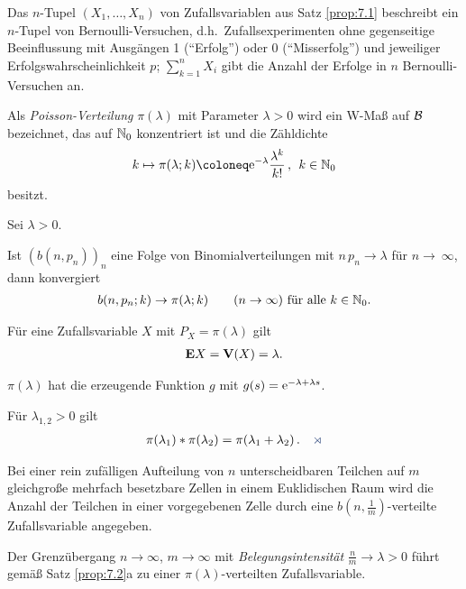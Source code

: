 \begin{bem}
\label{bem:7.1}
Das $n$-Tupel $(X_{1},\ldots, X_{n})$ von Zufallsvariablen aus Satz
\ref{prop:7.1} beschreibt ein $n$-Tupel von Bernoulli-Versuchen, d.h.\
Zufallsexperimenten ohne gegenseitige Beeinflussung mit Ausgängen 1
(``Erfolg'') oder 0 (``Misserfolg'') und jeweiliger Erfolgswahrscheinlichkeit
$p$; $\sum^ {n}_{k=1} X_{i}$ gibt die Anzahl der Erfolge in $n$
Bernoulli-Versuchen an.\maphere
\end{bem}

\begin{defn}
\label{defn:7.2}
Als \emph{Poisson-Verteilung} $\pi (\lambda )$ mit
Parameter $\lambda > 0$ wird ein W-Maß auf ${\mathcal{B}}$ bezeichnet, das auf
$\mathbb{N}_{0}$ konzentriert ist und die Zähldichte
\begin{align*}
k\mapsto \pi (\lambda ; k) \defl \e^ {-\lambda }\frac{\lambda ^ {k}}{k!} \, , \;\,
k\in \N_{0}
\end{align*}
besitzt.\fishhere
\end{defn}

\begin{prop}
\label{prop:7.2}
Sei $\lambda >0$.\\[-7mm]
\begin{propenum}
\item
Ist $(b(n,p_{n}))_n$ eine Folge von Binomialverteilungen mit $n\,p_{n}\to
\lambda$ für $n\to~\infty$, dann konvergiert
\begin{align*}
b(n,p_{n}; k)\to \pi (\lambda; k) \qquad (n\to \infty) \mbox{ für alle } k\in
\mathbb{N}_{0}.
\end{align*}
\item
Für eine Zufallsvariable $X$ mit $P_{X}= \pi (\lambda ) $ gilt
\begin{align*}
\textbf{E} X =\textbf{V}(X) =\lambda.
\end{align*}
\item
$\pi (\lambda )$ hat die erzeugende Funktion $g$ mit $g(s) = \mathrm{e}^ {-\lambda
+\lambda s}$.
\item
Für $\lambda _{1,2} > 0$ gilt
\begin{align*}
\pi (\lambda _{1})\ast \pi (\lambda _{2}) = \pi (\lambda _{1} +\lambda _{2})\,
.\fishhere
\end{align*}
\end{propenum}
\end{prop}

\begin{bem}
\label{bem:7.2}
Bei einer rein zufälligen Aufteilung von $n$
unterscheidbaren Teilchen auf $m$ gleichgroße mehrfach besetzbare Zellen in
einem Euklidischen Raum wird die Anzahl der Teilchen in einer vorgegebenen
Zelle durch eine $b(n,\frac{1}{m})$-verteilte Zufallsvariable angegeben.

Der Grenzübergang $n\to \infty$, $m\to \infty$ mit {\it Belegungsintensität}
$\frac{n}{m} \to \lambda > 0 $ führt gemäß Satz \ref{prop:7.2}a zu einer
$\pi(\lambda)$-verteilten Zufallsvariable.\maphere
\end{bem}

